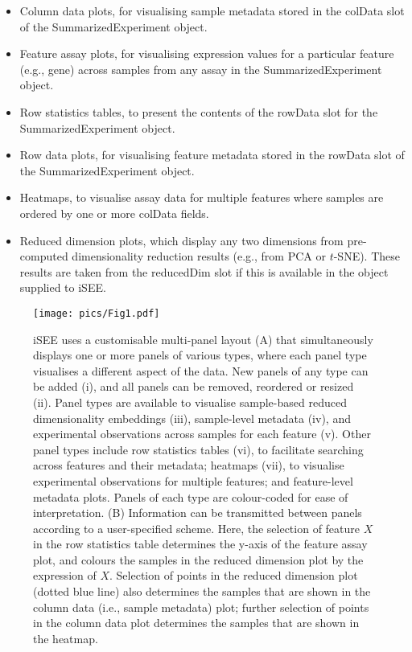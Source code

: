 \documentclass[10pt,a4paper,twocolumn]{article}
\begin{document}
\begin{itemize}
\item Column data plots, for visualising sample metadata stored in the colData slot of the SummarizedExperiment object.
\item Feature assay plots, for visualising expression values for a particular feature (e.g., gene) across samples from any assay in the SummarizedExperiment object.
\item Row statistics tables, to present the contents of the rowData slot for the SummarizedExperiment object.
\item Row data plots, for visualising feature metadata stored in the rowData slot of the SummarizedExperiment object.
\item Heatmaps, to visualise assay data for multiple features where samples are ordered by one or more colData fields.
\item Reduced dimension plots, which display any two dimensions from pre-computed dimensionality reduction results (e.g., from PCA or $t$-SNE).
These results are taken from the reducedDim slot if this is available in the object supplied to iSEE.
\end{itemize}

\begin{figure*}[t]
\texttt{[image: pics/Fig1.pdf]}
\caption{iSEE uses a customisable multi-panel layout (A) that simultaneously displays one or more panels of various types, where each panel type visualises a different aspect of the data.
New panels of any type can be added (i), and all panels can be removed, reordered or resized (ii).
Panel types are available to visualise sample-based reduced dimensionality embeddings (iii), sample-level metadata (iv), and experimental observations across samples for each feature (v).
Other panel types include row statistics tables (vi), to facilitate searching across features and their metadata; heatmaps (vii), to visualise experimental observations for multiple features; and feature-level metadata plots.
Panels of each type are colour-coded for ease of interpretation.
(B) Information can be transmitted between panels according to a user-specified scheme.
Here, the selection of feature $X$ in the row statistics table determines the y-axis of the feature assay plot, and colours the samples in the reduced dimension plot by the expression of $X$.
Selection of points in the reduced dimension plot (dotted blue line) also determines the samples that are shown in the column data (i.e., sample metadata) plot;
further selection of points in the column data plot determines the samples that are shown in the heatmap.
}
\label{fig:iSEE}
\end{figure*}
\end{document}
